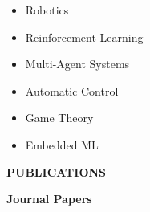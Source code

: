 \documentclass[12pt]{article}
\begin{document}
\begin{multicols}{3}
	\begin{itemize}
		\item Robotics
		\item Reinforcement Learning
		\item Multi-Agent Systems
		\item Automatic Control
		\item Game Theory
		\item Embedded ML
	\end{itemize}
\end{multicols}



\vspace{0.1in} %

\begin{center}
	{\noindent \bfseries PUBLICATIONS}
\end{center}

\vspace{8pt} %


\noindent
{\bfseries Journal Papers}
\vspace{6pt}
\end{document}
